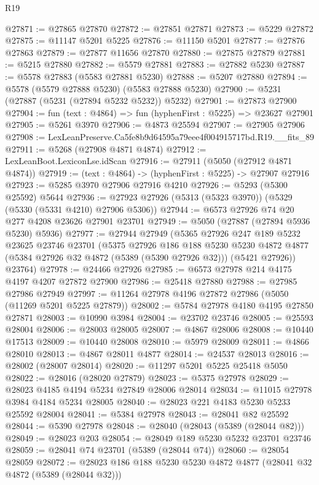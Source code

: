 \begin{lexlean}{R19}
\begin{coremodule}
@27871 := @27865 @27870
@27872 := @27851 @27871
@27873 := @5229 @27872
@27875 := @11147 @5201 @5225
@27876 := @11150 @5201
@27877 := @27876 @27863
@27879 := @27877 @11656 @27870
@27880 := @27875 @27879
@27881 := @5215 @27880
@27882 := @5579 @27881
@27883 := @27882 @5230
@27887 := @5578 @27883 (@5583 @27881 @5230)
@27888 := @5207 @27880
@27894 := @5578 (@5579 @27888 @5230) (@5583 @27888 @5230)
@27900 := @5231 (@27887 (@5231 (@27894 @5232 @5232)) @5232)
@27901 := @27873 @27900
@27904 := fun (text : @4864) => fun (hyphenFirst : @5225) => @23627 @27901
@27905 := @5261 @3970
@27906 := @4873 @25594
@27907 := @27905 @27906
@27908 := LexLeanPreserve.Ca5fe8b9d64595a79eee4f004915717bd.R19.__fits_89
@27911 := @5268 (@27908 @4871 @4874)
@27912 := LexLeanBoot.LexiconLse.idScan
@27916 := @27911 (@5050 (@27912 @4871 @4874))
@27919 := (text : @4864) -> (hyphenFirst : @5225) -> @27907 @27916
@27923 := @5285 @3970 @27906 @27916 @4210
@27926 := @5293 (@5300 @25592) @5644
@27936 := @27923 @27926 (@5313 (@5323 @3970)) (@5329 (@5330 (@5331 @4210) @27906 @5306))
@27944 := @6573 @27926 @74 @20 @277 @4208 @23626 @27901 @23701
@27949 := @5050 (@27887 (@27894 @5936 @5230) @5936)
@27977 := @27944
    @27949
    (@5365
      @27926
      @247
      @189
      @5232
      @23625
      @23746
      @23701
      (@5375
        @27926
        @186
        @188
        @5230
        @5230
        @4872
        @4877
        (@5384 @27926 @32 @4872 (@5389 (@5390 @27926 @32)))
        (@5421 @27926))
      @23764)
@27978 := @24466 @27926
@27985 := @6573 @27978 @214 @4175 @4197 @4207 @27872 @27900
@27986 := @25418 @27880
@27988 := @27985 @27986 @27949
@27997 := @11264 @27978 @4196 @27872 @27986 (@5050 (@11269 @5201 @5225 @27879))
@28002 := @5784 @27978 @4180 @4195 @27850 @27871
@28003 := @10990 @3984
@28004 := @23702 @23746
@28005 := @25593 @28004
@28006 := @28003 @28005
@28007 := @4867 @28006
@28008 := @10440 @17513
@28009 := @10440 @28008
@28010 := @5979 @28009
@28011 := @4866 @28010
@28013 := @4867 @28011 @4877
@28014 := @24537 @28013
@28016 := @28002 (@28007 @28014)
@28020 := @11297 @5201 @5225 @25418 @5050
@28022 := @28016 (@28020 @27879)
@28023 := @5375 @27978
@28029 := @28023 @4185 @4194 @5234 @27849 @28006 @28014
@28034 := @11015 @27978 @3984 @4184 @5234 @28005
@28040 := @28023 @221 @4183 @5230 @5233 @25592 @28004
@28041 := @5384 @27978
@28043 := @28041 @82 @25592
@28044 := @5390 @27978
@28048 := @28040 (@28043 (@5389 (@28044 @82)))
@28049 := @28023 @203
@28054 := @28049 @189 @5230 @5232 @23701 @23746
@28059 := @28041 @74 @23701 (@5389 (@28044 @74))
@28060 := @28054 @28059
@28072 := @28023 @186 @188 @5230 @5230 @4872 @4877 (@28041 @32 @4872 (@5389 (@28044 @32)))

\end{coremodule}
\end{lexlean}
